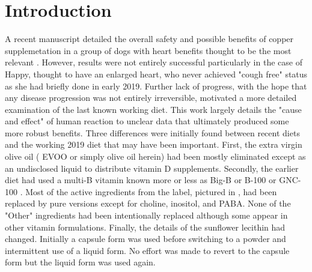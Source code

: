 \par

\newpage


\section{Introduction  }

A  recent manuscript detailed the overall safety and
possible benefits of copper supplemetation in a group of dogs
with heart benefits thought to be the most relevant
\cite{marchywka-MJM-2024-010-0.01rg}.
However, results were not entirely successful particularly in the
case of Happy, thought to have an enlarged heart,  who never achieved 
"cough free" status as she had briefly done in early 2019. 
Further lack of progress, 
with the hope that any disease progression was not entirely
irreversible, motivated a more detailed examination of the last known working diet.
This work largely details the "cause and effect" of human reaction
to unclear data that ultimately produced some more robust benefits. 
Three differences were initially found between recent diets and the
working 2019 diet that  may have been important.
First, the extra virgin olive oil ( EVOO or simply olive oil herein)
had been mostly eliminated except as an undisclosed liquid
to distribute vitamin D supplements. Secondly, the
earlier diet had used a multi-B vitamin known more or less
as Big-B or B-100 or GNC-100 \cite{250Caplets250Servings_100_Complex_}.
Most of the active ingredients from the label, pictured in ,
had been replaced by pure versions except for choline, inositol,
and PABA. None of the "Other" ingredients had been intentionally
replaced although some appear in other vitamin formulations.
Finally, the details of the sunflower lecithin had changed.
Initially a capsule form was used before switching to a powder
and intermittent use of a liquid form.  No effort was made
to revert to the capsule form but the liquid form was used again. 


